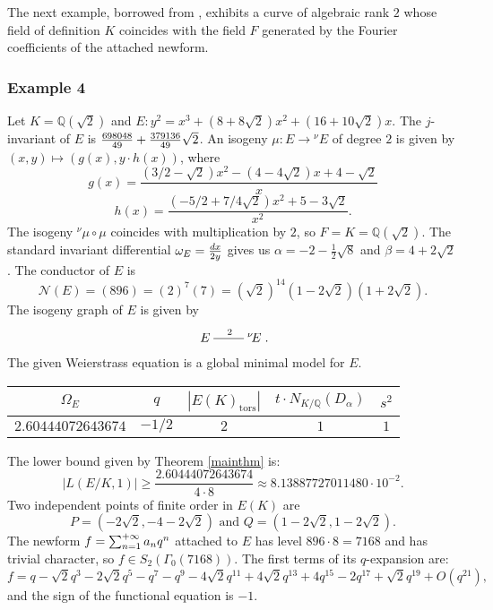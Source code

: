 \documentclass[11pt]{amsart}
\theoremstyle{definition}
\begin{document}
		The next example, borrowed from \cite[Proposition 10]{ell}, exhibits a curve of algebraic rank $2$ whose field of definition $K$ coincides with the field $F$ generated by the Fourier coefficients of the attached newform.

		\subsubsection*{Example 4}
		Let $K={\mathbb{Q}}(\sqrt{2})$ and $E\colon y^2=x^3+(8+8\sqrt{2})x^2+(16+10\sqrt{2})x$. The $j$-invariant of $E$ is ${\displaystyle} \frac{698048}{49}+\frac{379136}{49}\sqrt{2}$. An isogeny $\mu\colon E\to {{}^\nu\!} E$ of degree $2$ is given by $(x,y)\mapsto (g(x),y\cdot h(x))$, where
		$$g(x)=\frac{(3/2-\sqrt{2})x^2 - (4-4\sqrt{2})x +4-\sqrt{2}}{x}$$
		$$h(x)=\frac{(- 5/2+7/4\sqrt{2})x^2 + 5-3\sqrt{2}}{x^2}.$$
		The isogeny ${{}^\nu\!}\mu\circ\mu$ coincides with multiplication by $2$, so $F=K={\mathbb{Q}}(\sqrt{2})$. The standard invariant differential ${\displaystyle} \omega_E=\frac{dx}{2y}$ gives us $\alpha=-2-\frac{1}{2}\sqrt{8}$ and $\beta=4+2\sqrt{2}$. The conductor of $E$ is
		$$\mathcal N(E)=(896)=(2)^7(7)=(\sqrt{2})^{14}(1-2\sqrt{2})(1+2\sqrt{2}).$$
		The isogeny graph of $E$ is given by
		$$\begin{xymatrix}{E\ar@{-}[r]^2 & {{}^\nu\!} E}\end{xymatrix}.$$
		The given Weierstrass equation is a global minimal model for $E$.
			\begin{center}
				\begin{tabular}{| c | c | c | c | c |}
			    \hline
				$\Omega_E$ & $q$ & $|E(K)_{\text{tors}}|$ & $t\cdot N_{K/{\mathbb{Q}}}(D_{\alpha})$ & $s^2$ \\ \hline\hline
			    $2.60444072643674$ & $-1/2$ & $2$ & $1$ & $1$\\ \hline
			  \end{tabular}
		\end{center}
		The lower bound given by Theorem \ref{mainthm} is:
		$$|L(E/K,1)|\geq\frac{2.60444072643674}{4\cdot 8}\approx 8.13887727011480\cdot 10^{-2}.$$
		Two independent points of finite order in $E(K)$ are 
		$$P=(-2 \sqrt{2} ,-4 -2 \sqrt{2})\text{ and }Q=(1-2 \sqrt{2}, 1-2 \sqrt{2}).$$
		The newform ${\displaystyle} f=\sum_{n=1}^{+\infty}a_nq^n$ attached to $E$ has level $896\cdot 8=7168$ and has trivial character, so $f\in S_2(\Gamma_0(7168))$. The first terms of its $q$-expansion are:
		$$f=q-\sqrt{2}q^3-2\sqrt{2}q^5-q^7-q^9-4\sqrt{2}q^{11}+4\sqrt{2}q^{13}+4q^{15}-2q^{17}+\sqrt{2}q^{19}+O(q^{21}),$$
		and the sign of the functional equation is $-1$.
\end{document}
